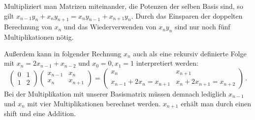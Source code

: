 \documentclass[course=erap]{aspdoc}
\begin{document}
Multipliziert man Matrizen miteinander, die Potenzen der selben Basis sind, so gilt $x_{n-1}y_n+x_ny_{n+1} = x_ny_{n-1}+x_{n+1}y_n$.
Durch das Einsparen der doppelten Berechnung von $x_n$ und das Wiederverwenden von $x_ny_n$ sind nur noch fünf Multiplikationen nötig. \par
Außerdem kann in folgender Rechnung $x_n$ auch als eine rekursiv definierte Folge mit $x_n=2x_{n-1}+x_{n-2}$ und $x_0=0, x_1=1$ interpretiert werden:
\[
\left(\begin{matrix}
      0 & 1 \\
      1 & 2
\end{matrix}\right)
\left(\begin{matrix}
      x_{n-1} & x_n \\
      x_n     & x_{n+1}
\end{matrix}\right)
=
\left(\begin{matrix}
      x_n &  x_{n+1}\\
      x_{n-1}+2x_n = x_{n+1} & x_n + 2x_{n+1}=x_{n+2}
\end{matrix}\right) \, .
\]
Bei der Multiplikation mit unserer Basismatrix müssen demnach lediglich $x_{n-1}$ und $x_n$ mit vier Multiplikationen berechnet werden. $x_{n+1}$ erhält man durch einen shift und eine Addition.
\end{document}
